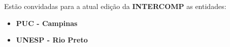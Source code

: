 
\begin{article}
	\label{art:convidadas}
	Estão convidadas para a atual edição da \textbf{INTERCOMP} as entidades:
	\begin{itemize}[noitemsep]
		\item \textbf{PUC - Campinas}
		\item \textbf{UNESP - Rio Preto}
	\end{itemize}
\end{article}
